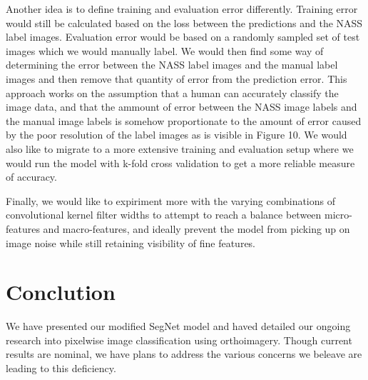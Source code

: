 \documentclass[12pt]{article}
\begin{document}
Another idea is to define training and evaluation error differently. Training error would still be calculated based on the loss between the predictions and the NASS label images. Evaluation error would be based on a randomly sampled set of test images which we would manually label. We would then find some way of determining the error between the NASS label images and the manual label images and then remove that quantity of error from the prediction error. This approach works on the assumption that a human can accurately classify the image data, and that the ammount of error between the NASS image labels and the manual image labels is somehow proportionate to the amount of error caused by the poor resolution of the label images as is visible in Figure 10.
We would also like to migrate to a more extensive training and evaluation setup where we would run the model with k-fold cross validation to get a more reliable measure of accuracy.

Finally, we would like to expiriment more with the varying combinations of convolutional kernel filter widths to attempt to reach a balance between micro-features and macro-features, and ideally prevent the model from picking up on image noise while still retaining visibility of fine features. 

\section{Conclution}

We have presented our modified SegNet model and haved detailed our ongoing research into pixelwise image classification using orthoimagery. Though current results are nominal, we have plans to address the various concerns we beleave are leading to this deficiency.
 


\end{document}
